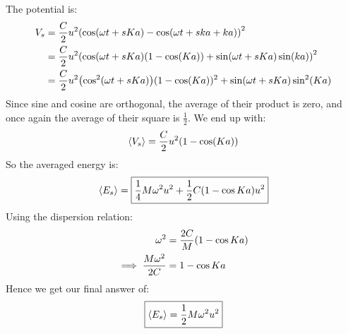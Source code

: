 \documentclass[12pt]{article}
\begin{document}
\begin{enumerate}[label=\alph*)]
  The potential is:
  \begin{align*}
    V_s&=\frac{C}{2}u^2\qty(\cos(\omega t+sKa)-\cos(\omega t+ska+ka))^2\\
    &=\frac{C}{2}u^2\qty(\cos(\omega t +sKa)(1-\cos(Ka))+
    \sin(\omega t+ sKa)\sin(k a))^2\\
    &=\frac{C}{2}u^2\qty(\cos^2(\omega t+sKa))(1-\cos(Ka))^2+
    \sin(\omega t+ sKa)\sin^2(K a)
  \end{align*}
  Since sine and cosine are orthogonal, the average of their product is zero, and once again the average of their square is $\frac{1}{2}$. We end up with:
  \begin{align*}
    \ev{V_s}=\frac{C}{2}u^2\qty(1-\cos(Ka))
  \end{align*}
  So the averaged energy is:
  \begin{align*}
    \ev{E_s}=\boxed{\frac{1}{4}M\omega^2u^2+\frac{1}{2}C\qty(1-\cos Ka)u^2}
  \end{align*}
  Using the dispersion relation:
  \begin{align*}
    \omega^2&=\frac{2C}{M}\qty(1-\cos Ka)\\
    \implies\frac{M\omega^2}{2C}&=1-\cos Ka
  \end{align*}
  Hence we get our final answer of:
  \begin{align*}
    \boxed{\ev{E_s}=\frac{1}{2}M\omega^2u^2}
  \end{align*}
\end{enumerate}
\end{document}
